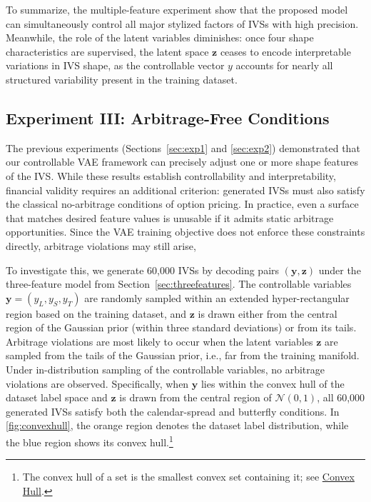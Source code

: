 \documentclass{article}
\begin{document}
{To summarize, the multiple-feature experiment show that the proposed model can simultaneously control all major stylized factors of IVSs with high precision. Meanwhile,  the  role of the latent variables diminishes: once  four shape characteristics are supervised, the latent space $\mathbf{z}$ ceases to encode interpretable variations in IVS shape, as the controllable vector $y$ accounts for nearly all structured variability present in the training dataset.


\subsection{Experiment III: Arbitrage-Free Conditions}
\label{sec:exp3}



The previous experiments (Sections~\ref{sec:exp1} and \ref{sec:exp2}) demonstrated that our controllable VAE framework can precisely adjust one or more shape features of the IVS. While these results establish controllability and interpretability, financial validity requires an additional criterion: generated IVSs must also satisfy the classical no-arbitrage conditions of option pricing. In practice, even a surface that matches desired feature values is unusable if it admits static arbitrage opportunities. Since the VAE training objective does not enforce these constraints directly, arbitrage violations may still arise,


To investigate this, we generate 60,000 IVSs  by decoding pairs $(\mathbf{y}, \mathbf{z})$ under the three-feature model from Section~\ref{sec:threefeatures}.  The controllable variables $\mathbf{y}=({y_L,y_S,y_T})$ are randomly sampled within an extended hyper-rectangular region based on the training dataset, and $\mathbf{z}$ is drawn either from the central region of the Gaussian prior (within three standard deviations) or from its tails.  Arbitrage violations are most likely to occur when the latent variables $\mathbf{z}$ are sampled from the tails of the Gaussian prior, i.e., far from the training manifold. Under in-distribution sampling of the controllable variables, no arbitrage violations are observed. Specifically, when $\mathbf{y}$ lies within the convex hull of the dataset label space and $\mathbf{z}$ is drawn from the central region of $\mathcal{N}(0,1)$, all 60,000 generated IVSs satisfy both the calendar-spread and butterfly conditions. In \autoref{fig:convexhull}, the orange region denotes the dataset label distribution, while the blue region shows its convex hull.\footnote{The convex hull of a set is the smallest convex set containing it; see \href{https://en.wikipedia.org/wiki/Convex_hull}{Convex Hull}.}

}
\end{document}

